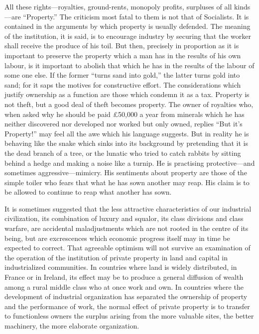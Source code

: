 \documentclass{book}
\begin{document}
All these rights—royalties, ground-rents, monopoly profits, surpluses of all kinds—are “Property.” The criticism most fatal to them is not that of Socialists. It is contained in the arguments by which property is usually defended. The meaning of the institution, it is said, is to encourage industry by securing that the worker shall receive the produce of his toil. But then, precisely in proportion as it is important to preserve the property which a man has in the results of his own labour, is it important to abolish that which he has in the results of the labour of some one else. If the former “turns sand into gold,” the latter turns gold into sand; for it saps the motives for constructive effort. The considerations which justify ownership as a function are those which condemn it as a tax. Property is not theft, but a good deal of theft becomes property. The owner of royalties who, when asked why he should be paid £50,000 a year from minerals which he has neither discovered nor developed nor worked but only owned, replies “But it’s Property!” may feel all the awe which his language suggests. But in reality he is behaving like the snake which sinks into its background by pretending that it is the dead branch of a tree, or the lunatic who tried to catch rabbits by sitting behind a hedge and making a noise like a turnip. He is practising protective—and sometimes aggressive—mimicry. His sentiments about property are those of the simple toiler who fears that what he has sown another may reap. His claim is to be allowed to continue to reap what another has sown.

It is sometimes suggested that the less attractive characteristics of our industrial civilization, its combination of luxury and squalor, its class divisions and class warfare, are accidental maladjustments which are not rooted in the centre of its being, but are excrescences which economic progress itself may in time be expected to correct. That agreeable optimism will not survive an examination of the operation of the institution of private property in land and capital in industrialized communities. In countries where land is widely distributed, in France or in Ireland, its effect may be to produce a general diffusion of wealth among a rural middle class who at once work and own. In countries where the development of industrial organization has separated the ownership of property and the performance of work, the normal effect of private property is to transfer to functionless owners the surplus arising from the more valuable sites, the better machinery, the more elaborate organization.
\end{document}
